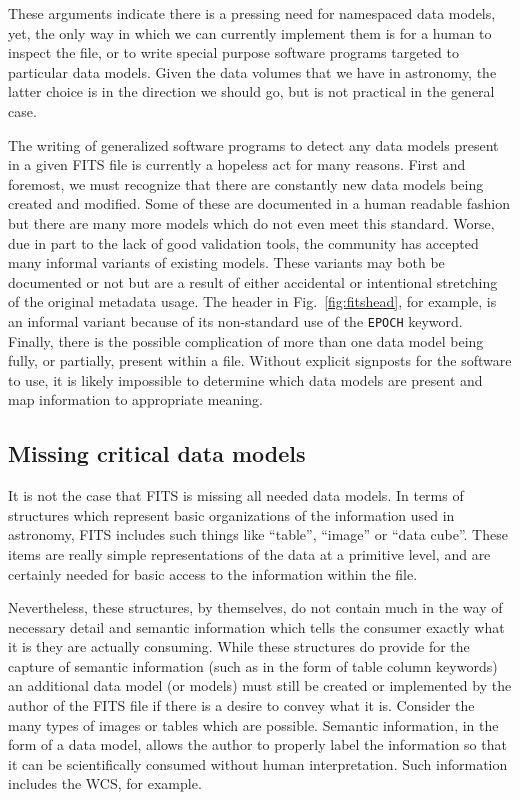 \documentclass[final,authoryear,5p,times,twocolumn]{elsarticle}
\begin{document}
{{These arguments indicate there is a pressing need for name\-spaced data models,
yet, the only way in which we can currently implement them is for a human
to inspect the file, or to write special purpose software programs targeted to
particular data models. Given the data volumes that we have in astronomy, the
latter choice is in the direction we should go, but is not practical
in the general case.


The writing of generalized software programs to detect any data models
present in a given FITS file is currently a hopeless act for many reasons.
First and foremost, we must recognize that there are constantly new data models
being created and modified. Some of these are documented in a human readable
fashion but there are many more models which do not even meet this standard.
Worse, due in part to the lack of good validation tools, the community has
accepted many informal variants of existing models. These variants may both 
be documented or not but are a result of either accidental or intentional 
stretching of the original metadata usage. The header in 
Fig.~\ref{fig:fitshead}, for example, is an informal variant because of its non-standard 
use of the \texttt{EPOCH} keyword.
Finally, there is the possible complication of more than one data model being
fully, or partially, present within a file. Without explicit signposts for
the software to use, it is likely impossible to determine which data models
are present and map information to appropriate meaning.


\subsection{Missing critical data models}
\label{section_crit_data_models}


It is not the case that FITS is missing all needed data models. In
terms of structures which represent basic organizations of the
information used in astronomy, FITS includes such things like ``table'',
``image'' or ``data cube''. These items are really simple representations
of the data at a primitive level, and are certainly needed for basic
access to the information within the file.


Nevertheless, these structures, by themselves, do not contain much in
the way of necessary detail and semantic information which tells the
consumer exactly what it is they are actually consuming. While these
structures do provide for the capture of semantic information (such as
in the form of table column keywords) an additional data model (or
models) must still be created or implemented by the author of the FITS
file if there is a desire to convey what it is. Consider the many
types of images or tables which are possible. Semantic information, in
the form of a data model, allows the author to properly label the
information so that it can be scientifically consumed without human
interpretation. Such information includes the WCS, for example.


}}
\end{document}
